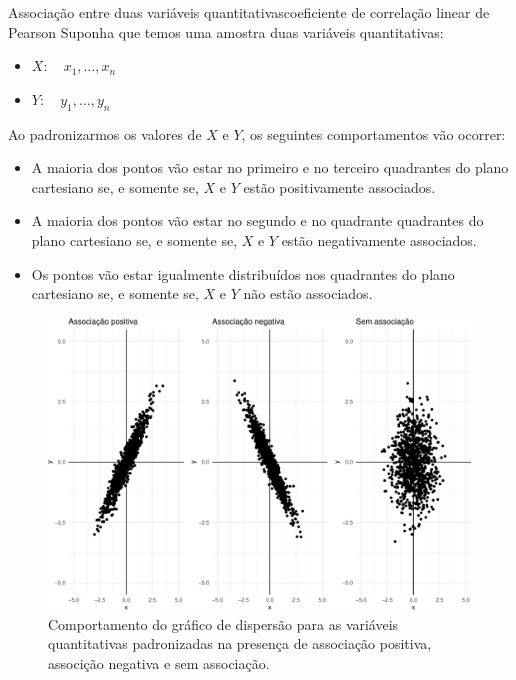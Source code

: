 \documentclass[
  10pt,
  ignorenonframetext,
]{beamer}
\providecommand{\tightlist}{%
  \setlength{\itemsep}{0pt}\setlength{\parskip}{0pt}}\usepackage{longtable,booktabs,array}
\begin{document}
\begin{frame}{Associação entre duas variáveis
quantitativas\newline coeficiente de correlação linear de Pearson}
\protect\hypertarget{associauxe7uxe3o-entre-duas-variuxe1veis-quantitativascoeficiente-de-correlauxe7uxe3o-linear-de-pearson}{}
Suponha que temos uma amostra duas variáveis quantitativas:

\begin{itemize}
\tightlist
\item
  \(X:\quad x_1,\dots, x_n\)
\item
  \(Y:\quad y_1,\dots, y_n\)
\end{itemize}

Ao padronizarmos os valores de \(X\) e \(Y\), os seguintes
comportamentos vão ocorrer:

\begin{itemize}
\tightlist
\item
  A maioria dos pontos vão estar no primeiro e no terceiro quadrantes do
  plano cartesiano se, e somente se, \(X\) e \(Y\) estão positivamente
  associados.
\item
  A maioria dos pontos vão estar no segundo e no quadrante quadrantes do
  plano cartesiano se, e somente se, \(X\) e \(Y\) estão negativamente
  associados.
\item
  Os pontos vão estar igualmente distribuídos nos quadrantes do plano
  cartesiano se, e somente se, \(X\) e \(Y\) não estão associados.
\end{itemize}
\end{frame}

\begin{frame}
\begin{figure}

{\centering \includegraphics[width=1\textwidth,height=\textheight]{exploracao-visualizacao_files/figure-beamer/unnamed-chunk-129-1.pdf}

}

\caption{Comportamento do gráfico de dispersão para as variáveis
quantitativas padronizadas na presença de associação positiva, associção
negativa e sem associação.}

\end{figure}
\end{frame}
\end{document}
